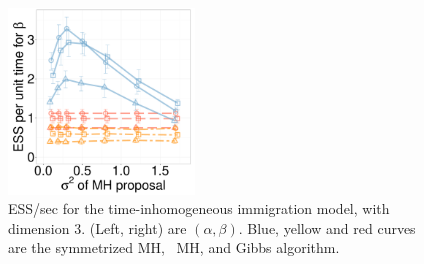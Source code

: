 \begin{figure}[H]
\begin{minipage}[!hp]{0.65\linewidth}
    \includegraphics [width=0.44\textwidth, angle=0]{figs/new_whole_exp_figs/cq_beta_dim3.pdf}
  \end{minipage}
  \begin{minipage}[!hp]{0.33\linewidth}
    \caption{ESS/sec for the time-inhomogeneous immigration model, with 
      dimension 3. (Left, right) are $(\alpha, \beta)$. Blue, yellow and red curves are the symmetrized MH,
  \naive\ MH, and Gibbs algorithm.}
     \label{fig:ESS_pc_33}
  \end{minipage}


\end{figure}
